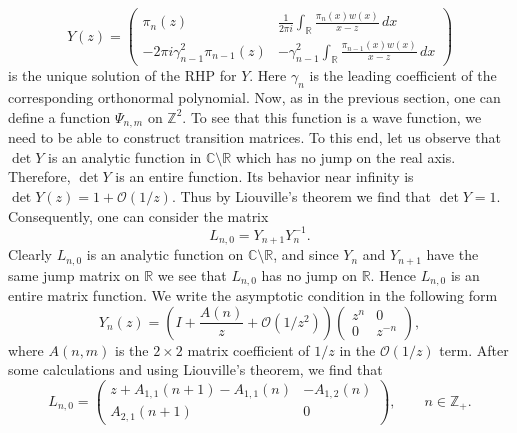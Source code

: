 \documentclass{amsart}
\theoremstyle{remark}
\numberwithin{equation}{section}
\begin{document}
    \begin{equation} \label{RHPYsolution}
        Y(z) =
        \begin{pmatrix}
            \pi_n(z) & \frac{1}{2\pi i} \int_{{\mathbb R}}  \frac{\pi_n(x) w(x)}{x-z}\,dx \\[2ex]
            -2\pi i \gamma_{n-1}^2 \pi_{n-1}(z) & -\gamma_{n-1}^2 \int_{{\mathbb R}} \frac{\pi_{n-1}(x)w(x)}{x-z}\,dx
        \end{pmatrix}
    \end{equation}
is the unique solution of the RHP for $Y$. Here $\gamma_n$ is the leading coefficient of the corresponding orthonormal polynomial.
Now, as in the previous section, one can define a function $\Psi_{n,m}$ on ${{\mathbb Z}}^2$. To see that
this function is a wave function, we need to be able to construct transition matrices.
To this end, let us observe that $\det Y$ is an analytic function in $\mathbb{C} \setminus \mathbb{R}$
which has no jump on the real axis. Therefore, $\det Y$ is an entire function. Its behavior near infinity
is $\det Y(z) = 1 + \mathcal{O}(1/z)$. Thus by Liouville's theorem we find that $\det Y = 1$. Consequently, one can consider
the matrix
\[
  L_{n,0} = Y_{n+1} Y_{n}^{-1}.
\]
Clearly $L_{n,0}$ is an analytic function on ${{\mathbb C}} \setminus {{\mathbb R}}$, and since $Y_{n}$
and $Y_{n+1}$ have the same jump matrix on $\mathbb{R}$ we see that $L_{n,0}$ has no jump on $\mathbb{R}$.
Hence $L_{n,0}$ is an entire matrix function. We write the asymptotic condition in the following form
\[
Y_{n}(z) = \left( I + \frac{A(n)}{z} + \mathcal{O}(1/z^2) \right)
		\begin{pmatrix} z^{n} & 0  \\ 0 & z^{-n} \end{pmatrix},
\]
where $A(n,m)$ is the $2\times 2$ matrix coefficient of $1/z$ in the $\mathcal{O}(1/z)$ term.
After some calculations and using Liouville's theorem, we find that
\begin{equation}\label{OP_transM}
L_{n,0} = \begin{pmatrix}
                  z+A_{1,1}(n+1)-A_{1,1}(n)  & -A_{1,2}(n)   \\
                  A_{2,1}(n+1)  & 0
                 \end{pmatrix}, \qquad n\in{{\mathbb Z}}_+.
\end{equation}
\end{document}
